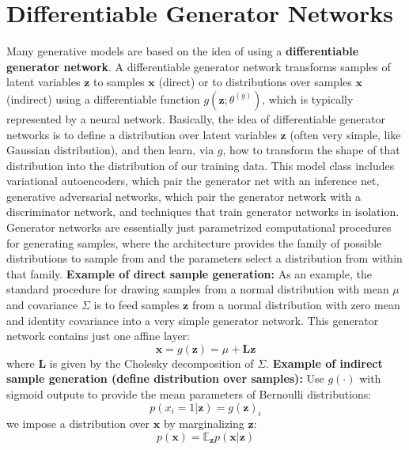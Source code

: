 \section{Differentiable Generator Networks}
Many generative models are based on the idea of using a \textbf{differentiable generator network}. A differentiable generator network transforms samples of latent variables $\textbf{z}$ to samples $\textbf{x}$ (direct) or to distributions over samples $\textbf{x}$ (indirect) using a differentiable function $g(\textbf{z};\theta^{(g)})$, which is typically represented by a neural network. Basically, the idea of differentiable generator networks is to define a distribution over latent variables $\textbf{z}$ (often very simple, like Gaussian distribution), and then learn, via $g$, how to transform the shape of that distribution into the distribution of our training data.\newline\newline
This model class includes variational autoencoders, which pair the generator net with an inference net, generative adversarial networks, which pair the generator network with a discriminator network, and techniques that train generator networks in isolation.\newline\newline
Generator networks are essentially just parametrized computational procedures for generating samples, where the architecture provides the family of possible distributions to sample from and the parameters select a distribution from within that family.\newline\newline
\textbf{Example of direct sample generation:} As an example, the standard procedure for drawing samples from a normal distribution with mean $\mu$ and covariance $\Sigma$ is to feed samples $\textbf{z}$ from a normal distribution with zero mean and identity covariance into a very simple generator network. This generator network contains just one affine layer:
\[\textbf{x} = g(\textbf{z}) = \mu + \textbf{L}\textbf{z}\]
where $\textbf{L}$ is given by the Cholesky decomposition of $\Sigma$.\newline\newline
\textbf{Example of indirect sample generation (define distribution over samples):} Use $g(\cdot)$ with sigmoid outputs to provide the mean parameters of
Bernoulli distributions:
\[p(x_i = 1 | \textbf{z}) = g(\textbf{z})_i\]
we impose a distribution over $\textbf{x}$ by marginalizing $\textbf{z}$:
\[p(\textbf{x}) = \mathbb{E}_\textbf{z}p(\textbf{x}|\textbf{z})\]
